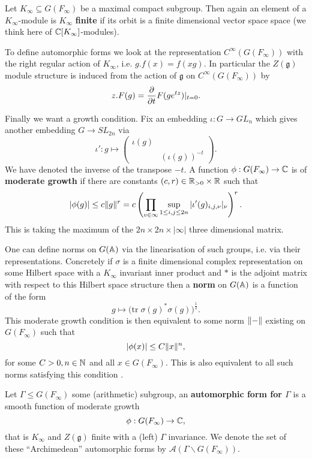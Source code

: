 	Let \(K_\infty\subseteq  G(F_\infty)\) be a maximal compact subgroup. Then again an element of a \(K_\infty\)-module is \(K_\infty\) \textbf{finite} if its orbit is a finite dimensional vector space space (we think here of \(\C[K_\infty]\)-modules).

	To define automorphic forms we look at the representation \(C^\infty(G(F_\infty))\) with the right regular action of \(K_\infty\), i.e. \(g.f(x) = f(xg)\).  In particular the \(Z(\mathfrak{g})\) module structure is induced from the action of \(\mathfrak{g}\) on \(C^\infty(G(F_\infty))\) by \label{lie_algebra_action}
	\[z.F(g) = \frac{\partial }{\partial t}F(ge^{tz})|_{t=0}.\] 
	
	Finally we want a growth condition. Fix an embedding \(\iota : G\to GL_n\) which gives another embedding \(G\to SL_{2n}\) via
	\[\iota': g\mapsto \begin{pmatrix}
		\iota (g) & \\
		& (\iota (g))^{-t}
	\end{pmatrix}.\]
	We have denoted the inverse of the transpose \(-t\). A function \(\phi : G(F_\infty) \to \C \) is of \textbf{moderate growth} if there are constants \((c,r)\in \R_{>0}\times \R\) such that 
	\[|\phi(g)| \leq c\norm{g}^r = c \left(\prod_{v\in\infty} \sup_{1\leq i, j\leq 2n} |\iota' (g)_{i,j, \nu}|_\nu\right)^r.\]
	This is taking the maximum of the \(2n\times 2n \times |\infty| \) three dimensional matrix. 

	\begin{remark}
		One can define norms on \(G(\A)\) via the linearisation of such groups, i.e. via their representations. Concretely if \(\sigma\) is a finite dimensional complex representation on some Hilbert space with a \(K_\infty\) invariant inner product and \(\ast\) is the adjoint matrix with respect to this Hilbert space structure then a \textbf{norm} on \(G(\A)\) is a function of the form
		\[g\mapsto \big(\mathrm{tr }\; \sigma(g)^*\sigma(g)\big)^{\frac{1}{2}}.\]
		This moderate growth condition is then equivalent to some norm \(\lVert  -  \rVert\) existing on \(G(F_\infty)\) such that 
		\[|\phi(x)| \leq C\norm{x}^n,\]
		for some \(C>0, n\in \N\) and all \(x\in G(F_\infty)\). This is also equivalent to all such norms satisfying this condition \cite[1.2]{borelAutomorphicFormsRepresentations1979}.
	\end{remark}

	\begin{Definition}
		Let \(\Gamma\leq G(F_\infty)\) some (arithmetic) subgroup, an \textbf{automorphic form for \(\Gamma\)} is a smooth function of moderate growth 
		\[\phi: G(F_\infty) \to \C,\]
		that is \(K_\infty\) and \(Z(\mathfrak{g})\) finite with a (left) \(\Gamma\) invariance. We denote the set of these ``Archimedean'' automorphic forms by \(\mathcal{A}(\Gamma \backslash G(F_\infty))\).
	\end{Definition}


